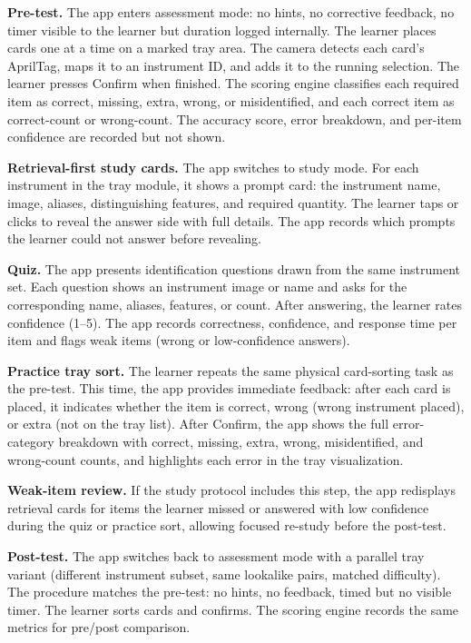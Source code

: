 \documentclass[10pt,a4paper]{article}
\begin{document}
\textbf{Pre-test.}
The app enters assessment mode: no hints, no corrective feedback, no
timer visible to the learner but duration logged internally. The learner
places cards one at a time on a marked tray area. The camera detects
each card's AprilTag, maps it to an instrument ID, and adds it to the
running selection. The learner presses Confirm when finished. The
scoring engine classifies each required item as correct, missing, extra,
wrong, or misidentified, and each correct item as correct-count or
wrong-count. The accuracy score, error breakdown, and per-item
confidence are recorded but not shown.

\textbf{Retrieval-first study cards.}
The app switches to study mode. For each instrument in the tray module,
it shows a prompt card: the instrument name, image, aliases,
distinguishing features, and required quantity. The learner taps or
clicks to reveal the answer side with full details. The app records
which prompts the learner could not answer before revealing.

\textbf{Quiz.}
The app presents identification questions drawn from the same instrument
set. Each question shows an instrument image or name and asks for the
corresponding name, aliases, features, or count. After answering, the
learner rates confidence (1--5). The app records
correctness, confidence, and response time per item and flags weak items
(wrong or low-confidence answers).

\textbf{Practice tray sort.}
The learner repeats the same physical card-sorting task as the pre-test.
This time, the app provides immediate feedback: after each card is
placed, it indicates whether the item is correct, wrong (wrong
instrument placed), or extra (not on the tray list). After Confirm, the
app shows the full error-category breakdown with correct, missing,
extra, wrong, misidentified, and wrong-count counts, and highlights
each error in the tray visualization.

\textbf{Weak-item review.}
If the study protocol includes this step, the app redisplays retrieval
cards for items the learner missed or answered with low confidence
during the quiz or practice sort, allowing focused re-study before the
post-test.

\textbf{Post-test.}
The app switches back to assessment mode with a parallel tray variant
(different instrument subset, same lookalike pairs, matched difficulty).
The procedure matches the pre-test: no hints, no feedback, timed but no
visible timer. The learner sorts cards and confirms. The scoring engine
records the same metrics for pre/post comparison.
\end{document}
